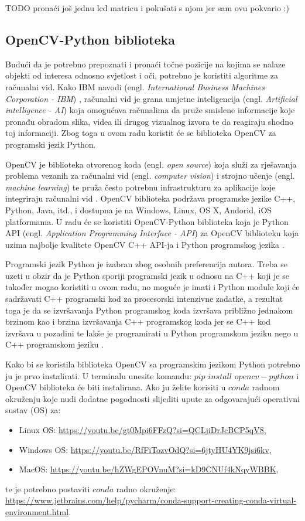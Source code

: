 \documentclass{foi}
\begin{document}
TODO pronaći još jednu lcd matricu i pokušati s njom jer sam ovu pokvario :)

\subsection{OpenCV-Python biblioteka}

Budući da je potrebno prepoznati i pronaći točne pozicije na kojima se nalaze objekti od interesa odnosno svjetlost i oči, potrebno je koristiti algoritme za računalni vid. Kako IBM navodi (engl. \emph{International Business Machines Corporation - IBM}) \cite{cv-ibm}, računalni vid je grana umjetne inteligencija (engl. \emph{Artificial intelligence - AI}) koja omogućava računalima da pruže smislene informacije koje pronađu obradom slika, videa ili drugog vizualnog izvora te da reagiraju shodno toj informaciji. Zbog toga u ovom radu koristit će se biblioteka OpenCV za programski jezik Python.

OpenCV je biblioteka otvorenog koda (engl. \emph{open source}) koja služi za rješavanja problema vezanih za računalni vid (engl. \emph{computer vision}) i strojno učenje (engl. \emph{machine learning}) te pruža često potrebnu infrastrukturu za aplikacije koje integriraju računalni vid \cite{opencv}. OpenCV biblioteka podržava programske jezike C++, Python, Java, itd., i dostupna je na Windows, Linux, OS X, Andorid, iOS platformama. U radu će se koristiti OpenCV-Python biblioteka koja je Python API (engl. \emph{Application Programming Interface - API}) za OpenCV biblioteku koja uzima najbolje kvalitete OpenCV C++ API-ja i Python programskog jezika \cite{opencv-python}.

Programski jezik Python je izabran zbog osobnih preferencija autora. Treba se uzeti u obzir da je Python sporiji programski jezik u odnosu na C++ koji je se također mogao koristiti u ovom radu, no moguće je imati i Python module koji će sadržavati C++ programski kod za procesorski intenzivne zadatke, a rezultat toga je da se izvršavanja Python programskog koda izvršava približno jednakom brzinom kao i brzina izvršavanja C++ programskog koda jer se C++ kod izvršava u pozadini te lakše je programirati u Python programskom jeziku nego u C++ programskom jeziku \cite{opencv-python}.

Kako bi se koristila biblioteka OpenCV sa programskim jezikom Python potrebno ju je prvo instalirati. U terminalu unesite komandu: $pip$ $install$ $opencv-python$ i OpenCV biblioteka će biti instalirana. Ako ju želite korisiti u $conda$ radnom okruženju koje nudi dodatne pogodnosti slijediti upute za odgovarajući operativni sustav (OS) za:
\begin{itemize}[noitemsep]
    \item Linux OS: \url{https://youtu.be/gt0Mpi6FFzQ?si=QCLjiDrJcBCP5qV8},
    \item Windows OS: \url{https://youtu.be/RfFiTozvOdQ?si=6jtyHU4YK9jsi6kv},
    \item MacOS: \url{https://youtu.be/hZWgEPOVnuM?si=kD9CNUf4kNqyWBBK},
\end{itemize}
te je potrebno postaviti $conda$ radno okruženje: \url{https://www.jetbrains.com/help/pycharm/conda-support-creating-conda-virtual-environment.html}.
\end{document}
